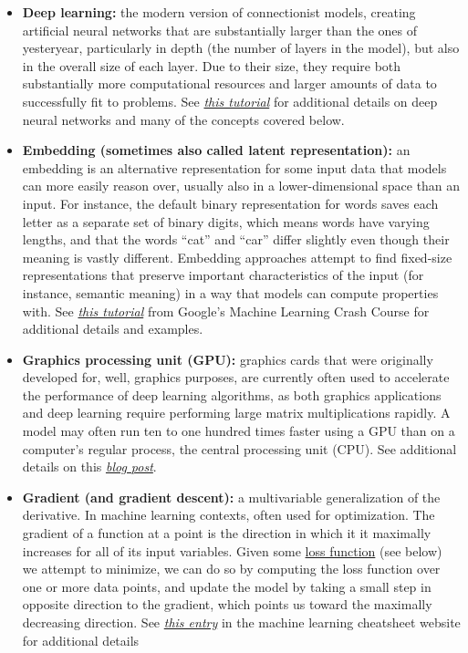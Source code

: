 \begin{itemize}
\item \textbf{Deep learning:\label{tg:deep-learning}} the modern version of connectionist models, creating artificial neural networks that are substantially larger than the ones of yesteryear, particularly in depth (the number of layers in the model), but also in the overall size of each layer. Due to their size, they require both substantially more computational resources and larger amounts of data to successfully fit to problems. See \href{https://skymind.ai/wiki/neural-network\#concept}{\emph{this tutorial}} for additional details on deep neural networks and many of the concepts covered below.

\item \textbf{Embedding (sometimes also called latent representation):\label{tg:embedding}} an embedding is an alternative representation for some input data that models can more easily reason over, usually also in a lower-dimensional space than an input. For instance, the default binary representation for words saves each letter as a separate set of binary digits, which means words have varying lengths, and that the words ``cat'' and ``car'' differ slightly even though their meaning is vastly different. Embedding approaches attempt to find fixed-size representations that preserve important characteristics of the input (for instance, semantic meaning) in a way that models can compute properties with. See \href{https://developers.google.com/machine-learning/crash-course/embeddings/obtaining-embeddings}{\emph{this tutorial}} from Google's Machine Learning Crash Course for additional details and examples.

\item \textbf{Graphics processing unit (GPU):\label{tg:gpu}} graphics cards that were originally developed for, well, graphics purposes, are currently often used to accelerate the performance of deep learning algorithms, as both graphics applications and deep learning require performing large matrix multiplications rapidly. A model may often run ten to one hundred times faster using a GPU than on a computer's regular process, the central processing unit (CPU). See additional details on this \href{http://timdettmers.com/2018/11/05/which-gpu-for-deep-learning/}{\emph{blog post}}.

\item \textbf{Gradient (and gradient descent):\label{tg:gradient}} a multivariable generalization of the derivative. In machine learning contexts, often used for optimization. The gradient of a function at a point is the direction in which it it maximally increases for all of its input variables. Given some \hyperref[tg:loss]{loss function} (see below) we attempt to minimize, we can do so by computing the loss function over one or more data points, and update the model by taking a small step in opposite direction to the gradient, which points us toward the maximally decreasing direction. See \href{https://ml-cheatsheet.readthedocs.io/en/latest/gradient_descent.html}{\emph{this entry}} in the machine learning cheatsheet website for additional details


\end{itemize}
